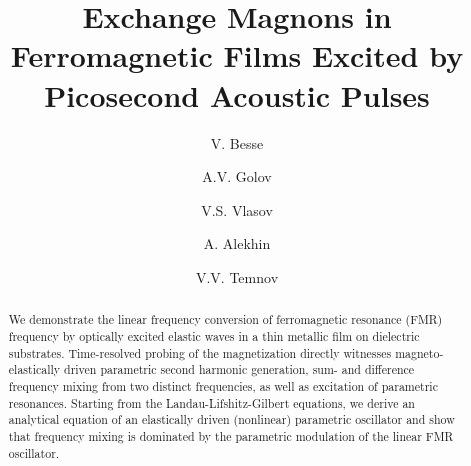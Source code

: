 \documentclass[aps,showpacs,prb,twocolumn,superscriptaddress]{revtex4}
\begin{document}
\title{Exchange Magnons in Ferromagnetic Films Excited by Picosecond Acoustic Pulses}



\author{V. Besse}
\author{A.V. Golov}
\author{V.S. Vlasov}
\author{A. Alekhin}
\author{V.V. Temnov}

\begin{abstract}
We demonstrate the linear frequency  conversion of ferromagnetic resonance (FMR) frequency  by optically excited elastic waves in a thin metallic film on dielectric substrates. Time-resolved probing of the magnetization directly witnesses magneto-elastically driven parametric second harmonic generation, sum- and difference frequency mixing from two distinct frequencies, as well as excitation of parametric resonances.  Starting from the Landau-Lifshitz-Gilbert equations, we derive an analytical equation of an elastically driven (nonlinear) parametric oscillator and show that frequency mixing is dominated by the parametric modulation  of the linear FMR oscillator.
\end{abstract}

\maketitle

\end{document}
